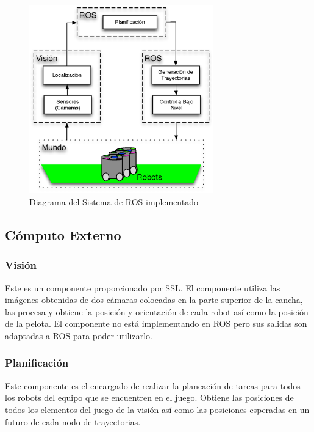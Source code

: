 \documentclass[twocolumn,10pt]{amrob}
\begin{document}
\begin{figure}
  \centering
    \includegraphics[width=8cm]{arqGeneral.eps}
  \caption{Diagrama del Sistema de ROS implementado}
  \label{fig:ROSGral}
\end{figure}
\subsection*{Cómputo Externo}
\subsubsection*{Visión}
Este es un componente proporcionado por SSL. El componente utiliza las imágenes obtenidas de dos cámaras colocadas en la parte superior de la cancha, las procesa y obtiene la posición y orientación de cada robot así como la posición de la pelota. El componente no está implementando en ROS pero sus salidas son adaptadas a ROS para poder utilizarlo.
\subsubsection*{Planificación}
Este componente es el encargado de realizar la planeación de tareas para todos los robots del equipo que se encuentren en el juego. Obtiene las posiciones de todos los elementos del juego de la visión así como las posiciones esperadas en un futuro de cada nodo de trayectorias.
\end{document}
